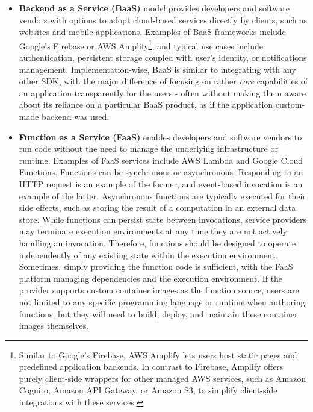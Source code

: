 \begin{itemize}
  \item \textbf{Backend as a Service (BaaS)} model provides developers and software vendors with options to adopt cloud-based services directly by clients, such as websites and mobile applications. Examples of BaaS frameworks include Google's Firebase or AWS Amplify\footnote{Similar to Google's Firebase, AWS Amplify lets users host static pages and predefined application backends. In contrast to Firebase, Amplify offers purely client-side wrappers for other managed AWS services, such as Amazon Cognito, Amazon API Gateway, or Amazon S3, to simplify client-side integrations with these services.}, and typical use cases include authentication, persistent storage coupled with user's identity, or notifications management. Implementation-wise, BaaS is similar to integrating with any other SDK, with the major difference of focusing on rather \emph{core} capabilities of an application transparently for the users - often without making them aware about its reliance on a particular BaaS product, as if the application custom-made backend was used.
  
  \item \textbf{Function as a Service (FaaS)} enables developers and software vendors to run code without the need to manage the underlying infrastructure or runtime. Examples of FaaS services include AWS Lambda and Google Cloud Functions. Functions can be synchronous or asynchronous. Responding to an HTTP request is an example of the former, and event-based invocation is an example of the latter. Asynchronous functions are typically executed for their side effects, such as storing the result of a computation in an external data store. While functions can persist state between invocations, service providers may terminate execution environments at any time they are not actively handling an invocation. Therefore, functions should be designed to operate independently of any existing state within the execution environment. Sometimes, simply providing the function code is sufficient, with the FaaS platform managing dependencies and the execution environment. If the provider supports custom container images as the function source, users are not limited to any specific programming language or runtime when authoring functions, but they will need to build, deploy, and maintain these container images themselves.
  
\end{itemize}

